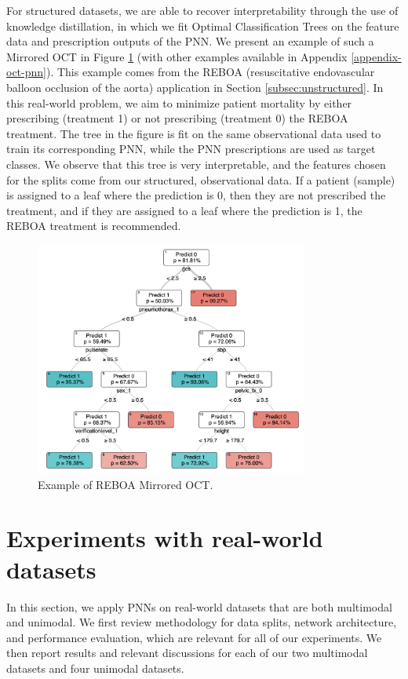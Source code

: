 \documentclass[10pt]{article} %
\begin{document}
For structured datasets, we are able to recover interpretability through the use of knowledge distillation, in which we fit Optimal Classification Trees \citep{optimal-classification-trees,MLbook} on the feature data and prescription outputs of the PNN.
We present an example of such a Mirrored OCT in Figure \ref{fig:reboa_tree} (with other examples available in Appendix \ref{appendix-oct-pnn}). This example comes from the REBOA (resuscitative endovascular balloon occlusion of the aorta) application in Section \ref{subsec:unstructured}. In this real-world problem, we aim to minimize patient mortality by either prescribing (treatment 1) or not prescribing (treatment 0) the REBOA treatment. The tree in the figure is fit on the same observational data used to train its corresponding PNN, while the PNN prescriptions are used as target classes. 
We observe that this tree is very interpretable, and the features chosen for the splits come from our structured, observational data. If a patient (sample) is assigned to a leaf where the prediction is 0, then they are not prescribed the treatment, and if they are assigned to a leaf where the prediction is 1, the REBOA treatment is recommended.

\begin{figure}[!ht]
  \caption{Example of REBOA Mirrored OCT.}\label{fig:reboa_tree}
  \begin{center} 
  \includegraphics[width=0.8\textwidth]{images/REBOA_OCT_seed1_iter3.png}
  \end{center}
\end{figure}

\section{Experiments with real-world datasets}\label{sec:realworld-datasets}
In this section, we apply PNNs on real-world datasets that are both multimodal and unimodal. We first review methodology for data splits, network architecture, and performance evaluation, which are relevant for all of our experiments. We then report results and relevant discussions for each of our two multimodal datasets and four unimodal datasets.
\end{document}
